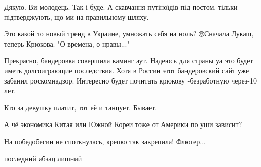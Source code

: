 \begin{itemize}
Дякую. Ви молодець. Так і буде. А скавчання путіноїдів під постом, тільки підтверджують, що ми на правильному шляху.

 
Это какой то новый тренд в Украине, умножать себя на ноль? 🤓Сначала Лукаш, теперь Крюкова. "О времена, о нравы..."

 

Прекрасно, бандеровка совершила каминг аут. Надеюсь для страны уа это будет
иметь долгоиграющие последствия. Хотя в России этот бандеровский сайт уже
забанил роскомнадзор. Интересно будет почитать крюкову -безработную через-10
лет.

 
Кто за девушку платит, тот её и танцует. Бывает.

 

А чё экономика Китая или Южной Кореи тоже от Америки по уши зависит?

 
На победобесии не споткнулась, крепко так закрепила! Флюгер...

 
последний абзац лишний

 

\end{itemize}
